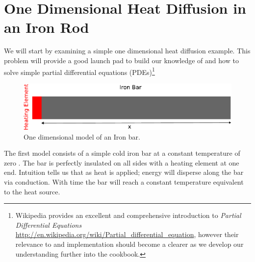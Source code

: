 
%
%
%

\section{One Dimensional Heat Diffusion in an Iron Rod}
We will start by examining a simple one dimensional heat diffusion example. This problem will provide a good launch pad to build our knowledge of \ESCRIPT and how to solve simple partial differential equations (PDEs)\footnote{Wikipedia provides an excellent and comprehensive introduction to \textit{Partial Differential Equations} \url{http://en.wikipedia.org/wiki/Partial_differential_equation}, however their relevance to \ESCRIPT and implementation should become a clearer as we develop our understanding further into the cookbook.}

\begin{figure}[h!]
\centerline{\includegraphics[width=4.in]{figures/onedheatdiff}}
\caption{One dimensional model of an Iron bar.}
\label{fig:onedhdmodel}
\end{figure}
The first model consists of a simple cold iron bar at a constant temperature of zero . The bar is perfectly insulated on all sides with a heating element at one end. Intuition tells us that as heat is applied; energy will disperse along the bar via conduction. With time the bar will reach a constant temperature equivalent to the heat source.

